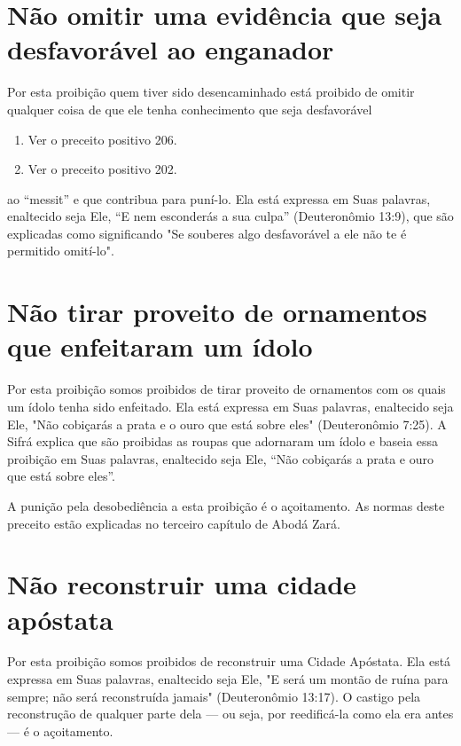 \section{Não omitir uma evidência que seja desfavorável ao enganador}

Por esta proibição quem tiver sido desencaminhado está proibido de
omitir qualquer coisa de que ele tenha conhecimento que seja
desfavorável


\begin{enumerate}
\def\labelenumi{\arabic{enumi}.}
\setcounter{enumi}{241}
\item
 
 Ver o preceito positivo 206.
 
\item
 
 Ver o preceito positivo 202.
 
\end{enumerate}

ao ``messit'' e que contribua para puní-lo. Ela está expressa em Suas
palavras, enaltecido seja Ele, ``E nem esconderás a sua culpa''
(Deuteronômio 13:9), que são explicadas como significando "Se souberes
algo desfavorável a ele não te é permitido omití-lo".

\section{Não tirar proveito de ornamentos que enfeitaram um ídolo}

Por esta proibição somos proibidos de tirar proveito de ornamentos com
os quais um ídolo tenha sido enfeitado. Ela está expressa em Suas
pala­vras, enaltecido seja Ele, "Não cobiçarás a prata e o ouro que está
sobre eles" (Deuteronômio 7:25). A Sifrá explica que são proibidas as
roupas que adorna­ram um ídolo e baseia essa proibição em Suas palavras,
enaltecido seja Ele, ``Não cobiçarás a prata e ouro que está sobre eles''.

A punição pela desobediência a esta proibição é o açoitamento. As normas
deste preceito estão explicadas no terceiro capítulo de Abodá Zará.

\section{Não reconstruir uma cidade apóstata}

Por esta proibição somos proibidos de reconstruir uma Cidade Após­tata.
Ela está expressa em Suas palavras, enaltecido seja Ele, "E será um
montão de ruína para sempre; não será reconstruída jamais" (Deuteronômio
13:17). O castigo pela reconstrução de qualquer parte dela --- ou seja,
por reedificá-la co­mo ela era antes --- é o açoitamento.


